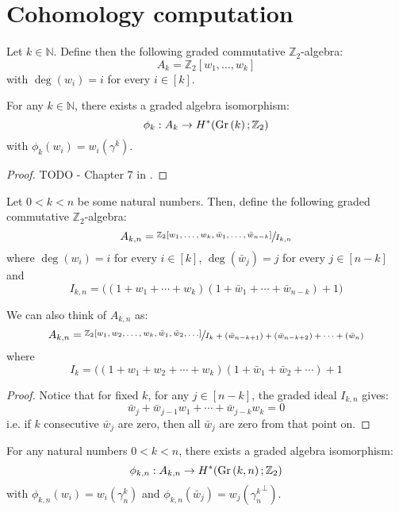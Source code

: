 \chapter{Cohomology computation}
\begin{definition} Let $k\in\mathbb{N}$. Define then the following graded commutative $\mathbb{Z}_2$-algebra:
\[A_k=\mathbb{Z}_2[w_1,\ldots,w_k]\]
with $\deg(w_i)=i$ for every $i\in[k]$.
\end{definition}
\begin{theorem} For any $k\in\mathbb{N}$, there exists a graded algebra isomorphism:
\[\phi_k:A_k\to H^*(\Gr{k};\mathbb{Z}_2)\]
with $\phi_k(w_i)=w_i(\gamma^k)$.
\end{theorem}
\begin{proof} TODO - Chapter 7 in \cite{char_class}.
\end{proof}
\begin{definition} Let $0<k<n$ be some natural numbers. Then, define the following graded commutative $\mathbb{Z}_2$-algebra:
\[A_{k,n}=\sfrac{\mathbb{Z}_2[w_1,\ldots,w_k,\bar{w}_1,\ldots,\bar{w}_{n-k}]}{I_{k,n}}\]
where $\deg(w_i)=i$ for every $i\in[k]$, $\deg(\bar{w}_j)=j$ for every $j\in[n-k]$ and
\[I_{k,n}=\big((1+w_1+\cdots+w_k)(1+\bar{w}_1+\cdots+\bar{w}_{n-k})+1\big)\]
\end{definition}
\begin{proposition} We can also think of $A_{k,n}$ as:
\[A_{k,n}=\sfrac{\mathbb{Z}_2[w_1,w_2,\ldots,w_k,\bar{w}_1,\bar{w}_2,\ldots]}{I_k+(\bar{w}_{n-k+1})+(\bar{w}_{n-k+2})+\cdots+(\bar{w}_{n})}\]
where
\[I_k=\big((1+w_1+w_2+\cdots+w_k)(1+\bar{w}_1+\bar{w}_2+\cdots)+1\]
\end{proposition}
\begin{proof} Notice that for fixed $k$, for any $j\in[n-k]$, the graded ideal $I_{k,n}$ gives:
\[\bar{w}_j+\bar{w}_{j-1}w_1+\cdots+\bar{w}_{j-k}w_k=0\]
i.e. if $k$ consecutive $\bar{w}_j$ are zero, then all $\bar{w}_j$ are zero from that point on.
\end{proof}
\begin{theorem} For any natural numbers $0<k<n$, there exists a graded algebra isomorphism:
\[\phi_{k,n}:A_{k,n}\to H^*(\Gr{k}{n};\mathbb{Z}_2)\]
with $\phi_{k,n}(w_i)=w_i(\gamma^k_n)$ and $\phi_{k,n}(\bar{w}_j)=w_j({\gamma^k_n}^{\perp})$.
\end{theorem}
